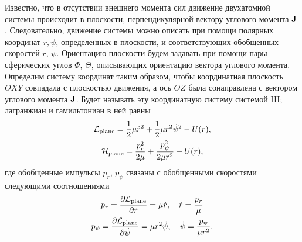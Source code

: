 Известно, что в отсутствии внешнего момента сил движение двухатомной системы происходит в плоскости, перпендикулярной вектору углового момента $\mathbf{J}$ \cite{goldstein}. Следовательно, движение системы можно описать при помощи полярных координат $r, \psi$, определенных в плоскости, и соответствующих обобщенных скоростей $\dot{r}$, $\dot{\psi}$. Ориентацию плоскости будем задавать при помощи пары сферических углов $\Phi$, $\Theta$, описывающих ориентацию вектора углового момента. Определим систему координат таким образом, чтобы координатная плоскость $OXY$ совпадала с плоскостью движения, а ось $OZ$ была сонаправлена с вектором углового момента $\mathbf{J}$. Будет называть эту координатную систему системой III; лагранжиан и гамильтониан в ней равны 
\begin{gather}
    \mathcal{L}_\text{plane} = \frac{1}{2} \mu \dot{r}^2 + \frac{1}{2} \mu r^2 \dot{\psi}^2 - U(r), \label{two-atom-plane-lagrangian} \\
    \mathcal{H}_\text{plane} = \frac{p_r^2}{2\mu} + \frac{p_\psi^2}{2 \mu r^2} + U(r), \label{two-atom-plane-hamiltonian} 
\end{gather}
%
где обобщенные импульсы $p_r$, $p_\psi$ связаны с обобщенными скоростями следующими соотношениями
\begin{gather}
    p_r = \frac{\partial \mathcal{L}_\text{plane}}{\partial \dot{r}} = \mu \dot{r}, \quad \dot{r} = \frac{p_r}{\mu} \label{two-atom-plane-momenta1} \\
    p_\psi = \frac{\partial \mathcal{L}_\text{plane}}{\partial \dot{\psi}} = \mu r^2 \dot{\psi}, \quad \dot{\psi} = \frac{p_\psi}{\mu r^2}.  \label{two-atom-plane-momenta2}
\end{gather}

